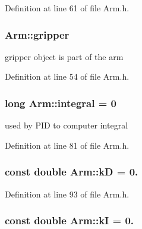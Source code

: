 Definition at line 61 of file Arm.\-h.

\hypertarget{classArm_a1f237e56fc1e76c2b63f1f59d847945d}{
\subsubsection[{gripper}]{ Arm\-::gripper}}\label{classArm_a1f237e56fc1e76c2b63f1f59d847945d}


gripper object is part of the arm 



Definition at line 54 of file Arm.\-h.

\hypertarget{classArm_aef466ce8350e1d73ed9a7b529512e90c}{
\subsubsection[{integral}]{\setlength{\rightskip}{0pt plus 5cm}long Arm\-::integral = 0\hspace{0.3cm}{\ttfamily [private]}}}\label{classArm_aef466ce8350e1d73ed9a7b529512e90c}


used by P\-I\-D to computer integral 



Definition at line 81 of file Arm.\-h.

\hypertarget{classArm_aba816c407060b76429a785f6b15a6980}{
\subsubsection[{k\-D}]{\setlength{\rightskip}{0pt plus 5cm}const double Arm\-::k\-D = 0.\hspace{0.3cm}{\ttfamily [private]}}}\label{classArm_aba816c407060b76429a785f6b15a6980}


Definition at line 93 of file Arm.\-h.

\hypertarget{classArm_a15dca8014bd3994a0d9b62efc0bcb983}{
\subsubsection[{k\-I}]{\setlength{\rightskip}{0pt plus 5cm}const double Arm\-::k\-I = 0.\hspace{0.3cm}{\ttfamily [private]}}}\label{classArm_a15dca8014bd3994a0d9b62efc0bcb983}


